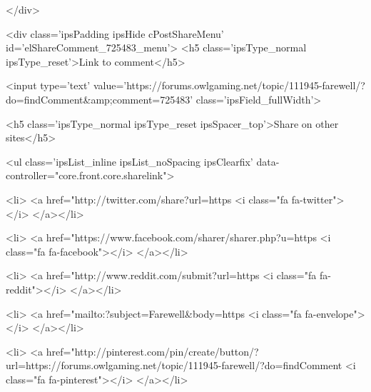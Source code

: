 		
	</div>

	

	



<div class='ipsPadding ipsHide cPostShareMenu' id='elShareComment_725483_menu'>
	<h5 class='ipsType_normal ipsType_reset'>Link to comment</h5>
	
		
	
	
	<input type='text' value='https://forums.owlgaming.net/topic/111945-farewell/?do=findComment&amp;comment=725483' class='ipsField_fullWidth'>

	
	<h5 class='ipsType_normal ipsType_reset ipsSpacer_top'>Share on other sites</h5>
	

	<ul class='ipsList_inline ipsList_noSpacing ipsClearfix' data-controller="core.front.core.sharelink">
		
			<li>
<a href="http://twitter.com/share?url=https%
	<i class="fa fa-twitter"></i>
</a></li>
		
			<li>
<a href="https://www.facebook.com/sharer/sharer.php?u=https%
	<i class="fa fa-facebook"></i>
</a></li>
		
			<li>
<a href="http://www.reddit.com/submit?url=https%
	<i class="fa fa-reddit"></i>
</a></li>
		
			<li>
<a href="mailto:?subject=Farewell&body=https%
	<i class="fa fa-envelope"></i>
</a></li>
		
			<li>
<a href="http://pinterest.com/pin/create/button/?url=https://forums.owlgaming.net/topic/111945-farewell/?do=findComment%
	<i class="fa fa-pinterest"></i>
</a></li>
		
